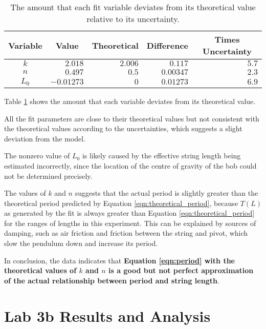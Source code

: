 \documentclass[aps,twocolumn,secnumarabic,nobalancelastpage,amsmath,amssymb,nofootinbib,floatfix,letterpaper]{revtex4}
\begin{document}
\begin{table}[ht]
    \begin{tabular}{c|r|r|r|r}
        Variable & \multicolumn{1}{c|}{Value} & \multicolumn{1}{c|}{Theoretical} & \multicolumn{1}{c|}{Difference} & \multicolumn{1}{c}{Times Uncertainty} \\
        \hline
        \(k\) & \(2.018\) & \(2.006\) & \(0.117\) & \(5.7\) \\
        \(n\) & \(0.497\) & \(0.5\) & \(0.00347\) & \(2.3\) \\
        \(L_0\) & \(-0.01273\) & \(0\) & \(0.01273\) & \(6.9\) \\
    \end{tabular}
    \caption{The amount that each fit variable deviates from its theoretical value relative to its uncertainty.}
    \label{table:lab3a_deviations}
\end{table}

Table \ref{table:lab3a_deviations} shows the amount that each variable deviates from its theoretical value.

All the fit parameters are close to their theoretical values but not consistent with the theoretical values according to
the uncertainties, which suggests a slight deviation from the model.

The nonzero value of \(L_0\) is likely caused by the effective string length being estimated incorrectly, since the
location of the centre of gravity of the bob could not be determined precisely.

The values of \(k\) and \(n\) suggests that the actual period is slightly greater than the theoretical period predicted
by Equation \ref{eqn:theoretical_period}, because \(T(L)\) as generated by the fit is always greater than Equation
\ref{eqn:theoretical_period} for the ranges of lengths in this experiment. This can be explained by sources of damping,
such as air friction and friction between the string and pivot, which slow the pendulum down and increase its period.

In conclusion, the data indicates that \textbf{Equation \ref{eqn:period} with the theoretical values of \(k\) and \(n\)
is a good but not perfect approximation of the actual relationship between period and string length}.


\section{Lab 3b Results and Analysis}
\end{document}
